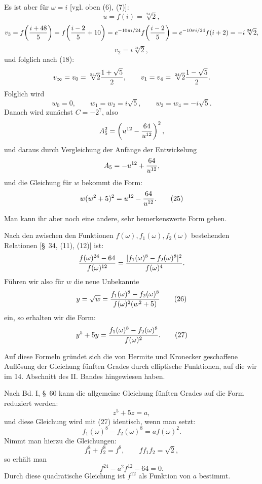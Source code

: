 \documentclass[11pt]{article}
\begin{document}
Es ist aber für \(\omega=i\) [vgl. oben (6), (7)]:
\[
 u=f(i)=\sqrt[24]{2},
\]
\[
 v_3=f\!\left({i+48\over5}\right)
 =f\!\left({i-2\over5}+10\right)
 =e^{-10\pi i/24}f\!\left({i-2\over5}\right)
 =e^{-10\pi i/24}f(i+2)=-i\sqrt[24]{2},
\]
\[
 v_2=i\sqrt[24]{2},
\]
und folglich nach (18):
\[
 v_\infty=v_0=\sqrt[24]{2}{1+\sqrt5\over2},\qquad
 v_1=v_4=\sqrt[24]{2}{1-\sqrt5\over2}.
\]
Folglich wird
\[
 w_0=0,\qquad w_1=w_2=i\sqrt5,\qquad w_3=w_4=-i\sqrt5.
\]
Danach wird zunächst \(C=-2^7\), also
\[
 A_5^2=\left(u^{12}-{64\over u^{12}}\right)^2,
\]
und daraus durch Vergleichung der Anfänge der Entwickelung
\[
 A_5=-u^{12}+{64\over u^{12}},
\]
und die Gleichung für \(w\) bekommt die Form:
\begin{equation}
 w(w^2+5)^2=u^{12}-{64\over u^{12}}.
\tag{25}
\end{equation}

Man kann ihr aber noch eine andere, sehr bemerkenswerte Form geben.

Nach den zwischen den Funktionen \(f(\omega),f_1(\omega),f_2(\omega)\) bestehenden Relationen [\S~34, (11), (12)] ist:
\[
 {f(\omega)^{24}-64\over f(\omega)^{12}}
 ={[f_1(\omega)^8-f_2(\omega)^8]^2\over f(\omega)^4}.
\]
Führen wir also für \(w\) die neue Unbekannte
\begin{equation}
 y=\sqrt w={f_1(\omega)^8-f_2(\omega)^8\over f(\omega)^2(w^2+5)}
\tag{26}
\end{equation}
ein, so erhalten wir die Form:
\begin{equation}
 y^5+5y={f_1(\omega)^8-f_2(\omega)^8\over f(\omega)^2}.
\tag{27}
\end{equation}

Auf diese Formeln gründet sich die von Hermite und Kronecker geschaffene Auflösung der Gleichung fünften Grades durch elliptische Funktionen, auf die wir im 14. Abschnitt des II. Bandes hingewiesen haben.

Nach Bd. I, \S~60 kann die allgemeine Gleichung fünften Grades auf die Form reduziert werden:
\begin{equation}
 z^5+5z=a,
\tag{28}
\end{equation}
und diese Gleichung wird mit (27) identisch, wenn man setzt:
\[
 f_1(\omega)^8-f_2(\omega)^8=af(\omega)^2.
\]
Nimmt man hierzu die Gleichungen:
\[
 f_1^8+f_2^8=f^8,\qquad ff_1f_2=\sqrt2,
\]
so erhält man
\begin{equation}
 f^{24}-a^2f^{12}-64=0.
\tag{29}
\end{equation}
Durch diese quadratische Gleichung ist \(f^{12}\) als Funktion von \(a\) bestimmt.
\end{document}
